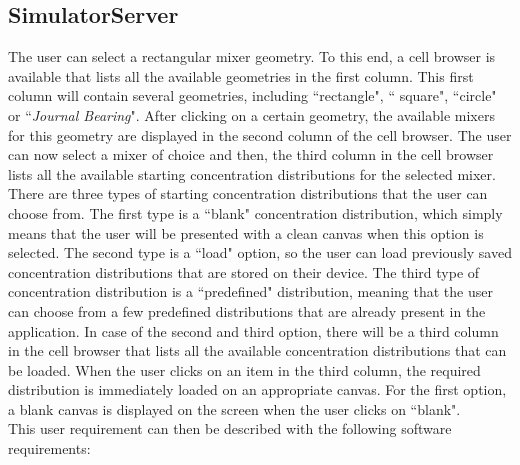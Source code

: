 
\subsection{SimulatorServer}

The user can select a rectangular mixer geometry. To this end, a cell browser is available that lists all the available geometries in the first column. This first column will contain several geometries, including ``rectangle", `` square", ``circle" or ``\emph{Journal Bearing}". After clicking on a certain geometry, the available mixers for this geometry are displayed in the second column of the cell browser. The user can now select a mixer of choice and then, the third column in the cell browser lists all the available starting concentration distributions for the selected mixer. There are three types of starting concentration distributions that the user can choose from. The first type is a ``blank" concentration distribution, which simply means that the user will be presented with a clean canvas when this option is selected. The second type is a ``load" option, so the user can load previously saved concentration distributions that are stored on their device. The third type of concentration distribution is a ``predefined" distribution, meaning that the user can choose from a few predefined distributions that are already present in the application. In case of the second and third option, there will be a third column in the cell browser that lists all the available concentration distributions that can be loaded. When the user clicks on an item in the third column, the required distribution is immediately loaded on an appropriate canvas. For the first option, a blank canvas is displayed on the screen when the user clicks on ``blank". \\
This user requirement can then be described with the following software requirements:

